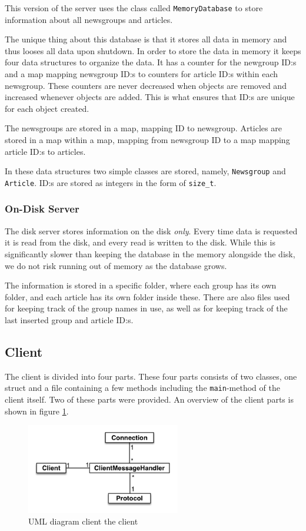 \documentclass[a4paper]{article}
\begin{document}
This version of the server uses the class called \texttt{MemoryDatabase} to store information about all newsgroups and articles.

The unique thing about this database is that it stores all data in memory and thus looses all data upon shutdown. In order to store the data in memory it keeps four data structures to organize the data. It has a counter for the newgroup ID:s and a map mapping newsgroup ID:s to counters for article ID:s within each newsgroup. These counters are never decreased when objects are removed and increased whenever objects are added. This is what ensures that ID:s are unique for each object created.

The newsgroups are stored in a map, mapping ID to newsgroup. Articles are stored in a map within a map, mapping from newsgroup ID to a map mapping article ID:s to articles.

In these data structures two simple classes are stored, namely, \texttt{Newsgroup} and \texttt{Article}. ID:s are stored as integers in the form of \texttt{size\_t}.


\subsubsection{On-Disk Server}
The disk server stores information on the disk \emph{only}. Every time data is requested it is read from the disk, and every read is written to the disk. While this is significantly slower than keeping the database in the memory alongside the disk, we do not risk running out of memory as the database grows.

The information is stored in a specific folder, where each group has its own folder, and each article has its own folder inside these. There are also files used for keeping track of the group names in use, as well as for keeping track of the last inserted group and article ID:s.

\subsection{Client}
The client is divided into four parts. These four parts consists of two classes, one struct and a file containing a few methods including the \texttt{main}-method of the client itself. Two of these parts were provided. An overview of the client parts is shown in figure \ref{clientUML}.

\begin{figure}
    \centering
    \includegraphics[width=0.6\textwidth]{projectUML-client.png}
    \caption{UML diagram client the client}
    \label{clientUML}
\end{figure}
\end{document}

